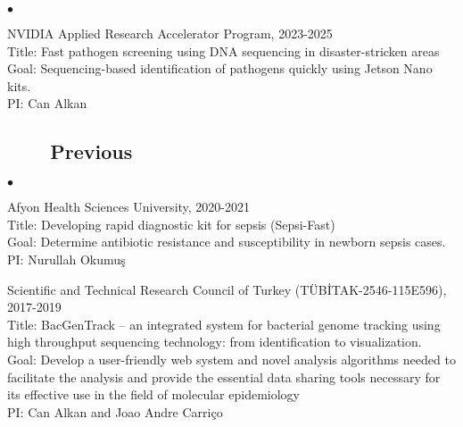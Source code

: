 \documentclass[margin,line]{res}
\newenvironment{list2}{
  \begin{list}{$\bullet$}{%
      \setlength{\itemsep}{0.1cm}
      \setlength{\parsep}{0in} \setlength{\parskip}{0in}
      \setlength{\topsep}{0in} \setlength{\partopsep}{0in} 
      \setlength{\leftmargin}{0.2in}}}{\end{list}}
\begin{document}
\begin{resume}
\begin{list2}
   \item
   NVIDIA Applied Research Accelerator Program, 2023-2025\\
   Title: Fast pathogen screening using DNA sequencing in disaster-stricken areas\\
   Goal: Sequencing-based identification of pathogens quickly using Jetson Nano kits.\\
   PI: Can Alkan

  \end{list2}


\vspace{-0.5cm}
                                       \subsection{\small \sc ~~~~Previous}
                                       \begin{list2}
                                       
                                       \item
        Afyon Health Sciences University, 2020-2021\\
        Title: Developing rapid diagnostic kit for sepsis (Sepsi-Fast)\\
        Goal: Determine antibiotic resistance and susceptibility in newborn sepsis cases.\\
        PI: Nurullah Okumuş
                                       \item
                                         Scientific and Technical Research Council of Turkey (T\"{U}B\.{I}TAK-2546-115E596), 2017-2019\\
                                         Title: BacGenTrack – an integrated system for bacterial genome tracking using high throughput sequencing technology: from identification to visualization.\\
                                         Goal: Develop a user-friendly web system and novel analysis algorithms needed to facilitate the analysis and provide
                                         the essential data sharing tools necessary for its effective use in the field of molecular epidemiology\\
                                         PI: Can Alkan and Joao Andre Carriço


\end{list2}
\end{resume}
\end{document}
